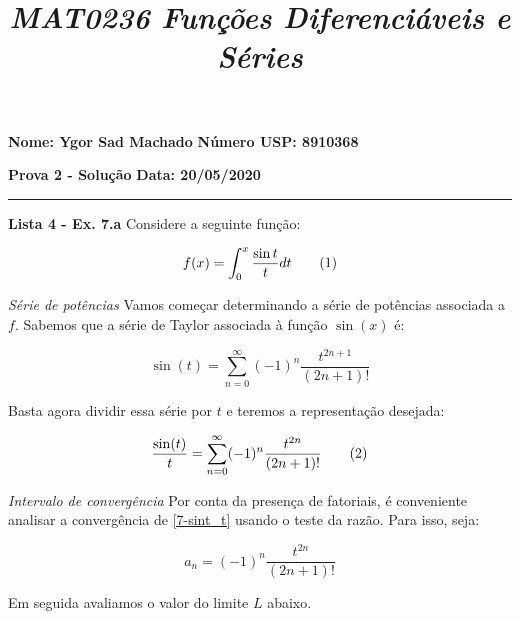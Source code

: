 \documentclass[12.5pt,reqno,a4paper]{amsart}
\newcommand\numberthis{\addtocounter{equation}{1}\tag{\theequation}}
\begin{document}
\parindent=0pt

\title[MAT0236 - P2]
{\textit{MAT0236 Funções Diferenciáveis e Séries}\\\vspace{3\jot}}%

\footskip=28pt

\maketitle
\thispagestyle{empty} 
\pagestyle{plain}
\onehalfspace

\textbf{Nome: Ygor Sad Machado}\hfill
\textbf{Número USP: 8910368}\null

\medskip
\textbf{Prova 2 - Solução}\hfill
\textbf{Data: 20/05/2020}\null

\noindent\rule{\textwidth}{0.4pt}

\medskip
\textbf{Lista 4 - Ex. 7.a}
\medbreak
Considere a seguinte função:

\begin{equation*}
    f(x) = \int_0^x \frac{\sin t}{t} dt \numberthis \label{7-base_int}
\end{equation*}

\bigskip
\textit{Série de potências}
\medbreak
Vamos começar determinando a série de potências associada a $f$. Sabemos que a série de Taylor associada à função $\sin(x)$ é:

\begin{equation*}
    \sin(t) = \sum_{n=0}^\infty (-1)^n \frac{t^{2n + 1}}{(2n + 1)!}
\end{equation*}

\bigskip
Basta agora dividir essa série por $t$ e teremos a representação desejada:

\begin{equation*}
    \frac{\sin(t)}{t} = \sum_{n=0}^\infty (-1)^n \frac{t^{2n}}{(2n + 1)!} \numberthis \label{7-sint_t}
\end{equation*}

\bigskip
\bigskip
\textit{Intervalo de convergência}
\medbreak
Por conta da presença de fatoriais, é conveniente analisar a convergência de \eqref{7-sint_t} usando o teste da razão. Para isso, seja:

\begin{equation*}
    a_n = (-1)^n \frac{t^{2n}}{(2n + 1)!}
\end{equation*}

\bigskip
Em seguida avaliamos o valor do limite $L$ abaixo.
\end{document}
